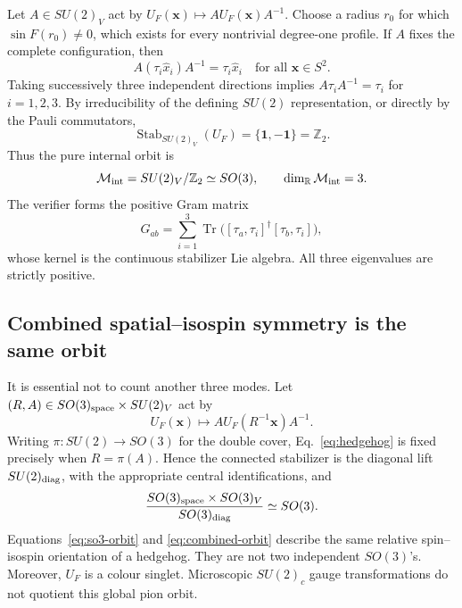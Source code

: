 \documentclass[11pt]{article}
\theoremstyle{definition}
\theoremstyle{remark}
\newcommand{\RR}{\mathbb R}
\newcommand{\ZZ}{\mathbb Z}
\newcommand{\cM}{\mathcal M}
\newcommand{\Tr}{\operatorname{Tr}}
\begin{document}
Let \(A\in SU(2)_V\) act by
\(U_F(\bm x)\mapsto A U_F(\bm x)A^{-1}\).
Choose a radius \(r_0\) for which \(\sin F(r_0)\ne0\), which exists for every
nontrivial degree-one profile.  If \(A\) fixes the complete configuration,
then
\begin{equation}
 A(\tau_i\widehat x_i)A^{-1}=\tau_i\widehat x_i
 \quad\text{for all }\widehat{\bm x}\in S^2.
 \label{eq:all-directions}
\end{equation}
Taking successively three independent directions implies
\(A\tau_iA^{-1}=\tau_i\) for \(i=1,2,3\).  By irreducibility of the defining
\(SU(2)\) representation, or directly by the Pauli commutators,
\begin{equation}
 \operatorname{Stab}_{SU(2)_V}(U_F)=\{\bm1,-\bm1\}=\ZZ_2.
 \label{eq:pure-stabilizer}
\end{equation}
Thus the pure internal orbit is
\begin{equation}
 \cM_{\rm int}=SU(2)_V/\ZZ_2\simeq SO(3),
 \qquad \dim_\RR\cM_{\rm int}=3.
 \label{eq:so3-orbit}
\end{equation}
The verifier forms the positive Gram matrix
\begin{equation}
 G_{ab}=\sum_{i=1}^3
 \Tr\bigl([\tau_a,\tau_i]^\dagger[\tau_b,\tau_i]\bigr),
 \label{eq:stabilizer-gram}
\end{equation}
whose kernel is the continuous stabilizer Lie algebra.  All three eigenvalues
are strictly positive.

\subsection{Combined spatial--isospin symmetry is the same orbit}

It is essential not to count another three modes.  Let
\((R,A)\in SO(3)_{\rm space}\times SU(2)_V\) act by
\begin{equation}
 U_F(\bm x)\longmapsto A U_F(R^{-1}\bm x)A^{-1}.
 \label{eq:combined-action}
\end{equation}
Writing \(\pi:SU(2)\to SO(3)\) for the double cover, Eq.~\eqref{eq:hedgehog}
is fixed precisely when \(R=\pi(A)\).  Hence the connected stabilizer is the
diagonal lift \(SU(2)_{\rm diag}\), with the appropriate central
identifications, and
\begin{equation}
 \frac{SO(3)_{\rm space}\times SO(3)_V}{SO(3)_{\rm diag}}
 \simeq SO(3).
 \label{eq:combined-orbit}
\end{equation}
Equations~\eqref{eq:so3-orbit} and \eqref{eq:combined-orbit} describe the same
relative spin--isospin orientation of a hedgehog.  They are not two
independent \(SO(3)\)'s.  Moreover, \(U_F\) is a colour singlet.  Microscopic
\(SU(2)_c\) gauge transformations do not quotient this global pion orbit.
\end{document}
